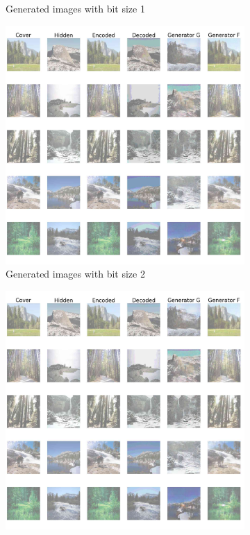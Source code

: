 \documentclass[conference]{IEEEtran}
\begin{document}
\begin{figure}[!hbt]
\begin{subfigure}[b]{0.26\textwidth}
            \caption{Generated images with bit size 1}
            \label{bit_size_1}
    \end{subfigure}
    \hspace{0.05\textwidth}
    \begin{subfigure}[b]{0.26\textwidth}
    \centering
            \includegraphics[scale=0.07]{images/bit_size_training_2.jpg}
            \caption{Generated images with bit size 2}
            \label{bit_size_2}
    \end{subfigure}
    \hspace{0.05\textwidth}
    \begin{subfigure}[b]{0.26\textwidth}
    \centering
            \includegraphics[scale=0.07]{images/bit_size_training_3.jpg}

\end{subfigure}
\end{figure}
\end{document}
